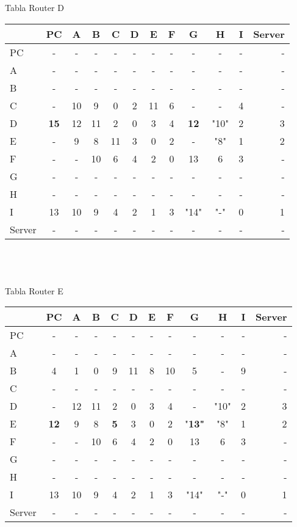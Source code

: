 \documentclass{article}
\begin{document}
\\
\\
Tabla Router D	 \\
\begin{tabular}{l*{10}{c}r}
              & PC & A & B & C & D & E & F & G & H & I & Server \\
\hline
PC             & - & - & - & - & - & - & - & - & - & - & -\\
A              & - & - & - & - & - & - & - & - & - & - & -\\
B              & - & - & - & - & - & - & - & - & - & - & -\\
C              & - & 10 & 9 & 0 & 2 & 11 & 6 & - & - & 4 & -\\
D              &\bf{15}& 12 & 11 & 2 & 0 & 3 & 4 &\bf{12}& "10" & 2 & 3\\
E              & - & 9 & 8 & 11 & 3 & 0 & 2 & - & "8" & 1 & 2\\
F              & - & - & 10 & 6 & 4 & 2 & 0 & 13 & 6 & 3 & -\\
G              & - & - & - & - & - & - & - & - & - & - & -\\
H              & - & - & - & - & - & - & - & - & - & - & -\\
I              & 13 & 10 & 9 & 4 & 2 & 1 & 3 & "14" & "-" & 0 & 1\\
Server         & - & - & - & - & - & - & - & - & - & - & -\\

\end{tabular}\\
\\
\\
Tabla Router E \\
\begin{tabular}{l*{10}{c}r}
              & PC & A & B & C & D & E & F & G & H & I & Server \\
\hline
PC             & - & - & - & - & - & - & - & - & - & - & -\\
A              & - & - & - & - & - & - & - & - & - & - & -\\
B              & 4 & 1 & 0 & 9 & 11	& 8 & 10 & 5 & - & 9 & -\\
C              & - & - & - & - & - & - & - & - & - & - & -\\
D              & - & 12 & 11 & 2 & 0 & 3 & 4 & - & "10" & 2 & 3\\
E              &\bf{12}& 9 & 8 &\bf{5}& 3 & 0 & 2 &"\bf{13}"& "8" & 1 & 2\\
F              & - & - & 10 & 6 & 4 & 2 & 0 & 13 & 6 & 3 & -\\
G              & - & - & - & - & - & - & - & - & - & - & -\\
H              & - & - & - & - & - & - & - & - & - & - & -\\
I              & 13 & 10 & 9 & 4 & 2 & 1 & 3 & "14" & "-" & 0 & 1\\
Server         & - & - & - & - & - & - & - & - & - & - & -\\

\end{tabular}
\end{document}
